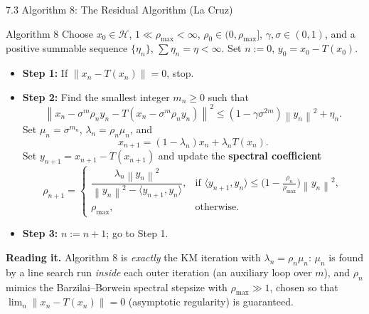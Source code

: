 \documentclass[aspectratio=169,10pt]{beamer}
\newcommand{\mHH}{\mathcal H}
\newcommand{\inner}[2]{\langle #1, #2 \rangle}
\newcommand{\norm}[1]{\left\|#1\right\|}
\begin{document}
\begin{frame}{7.3 Algorithm 8: The Residual Algorithm (La Cruz)}

  \begin{block}{Algorithm 8}
    \footnotesize
    Choose $x_0\in\mHH$, $1\ll\rho_{\max}<\infty$,
    $\rho_0\in(0,\rho_{\max}]$, $\gamma,\sigma\in(0,1)$, and a
    positive summable sequence $\{\eta_n\}$, $\sum\eta_n=\eta<\infty$.
    Set $n:=0$, $y_0=x_0-T(x_0)$.
    \begin{itemize}
      \item \textbf{Step 1:} If $\norm{x_n-T(x_n)}=0$, stop.
      \item \textbf{Step 2:} Find the smallest integer $m_n\ge0$ such that
      \[
        \norm{x_n-\sigma^m\rho_ny_n-T(x_n-\sigma^m\rho_ny_n)}^2
          \le(1-\gamma\sigma^{2m})\norm{y_n}^2+\eta_n. \tag{7.29}
      \]
      Set $\mu_n=\sigma^{m_n}$, $\lambda_n=\rho_n\mu_n$, and
      \[
        x_{n+1}=(1-\lambda_n)x_n+\lambda_nT(x_n). \tag{7.30}
      \]
      Set $y_{n+1}=x_{n+1}-T(x_{n+1})$ and update the
      \textbf{spectral coefficient}
      \[
        \rho_{n+1}=
        \begin{cases}
          \dfrac{\lambda_n\norm{y_n}^2}{\norm{y_n}^2-\inner{y_{n+1}}{y_n}}, &
            \text{if }\inner{y_{n+1}}{y_n}\le\bigl(1-\tfrac{\rho_n}{\rho_{\max}}\bigr)\norm{y_n}^2,\\
          \rho_{\max}, & \text{otherwise.}
        \end{cases}
      \]
      \item \textbf{Step 3:} $n:=n+1$; go to Step 1.
    \end{itemize}
  \end{block}

  \textbf{Reading it.} Algorithm 8 is \emph{exactly} the KM
  iteration with $\lambda_n=\rho_n\mu_n$: $\mu_n$ is found by a line
  search run \emph{inside} each outer iteration (an auxiliary loop
  over $m$), and $\rho_n$ mimics the Barzilai--Borwein spectral
  stepsize with $\rho_{\max}\gg1$, chosen so that
  $\lim_n\norm{x_n-T(x_n)}=0$ (asymptotic regularity) is guaranteed.

\end{frame}
\end{document}
